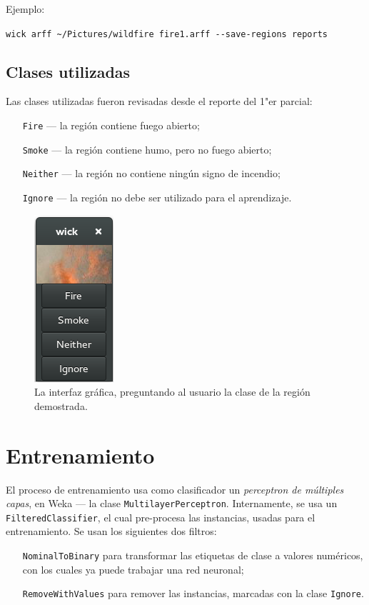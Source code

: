 \documentclass{article}
\begin{document}
\noindent
Ejemplo:

\verb|wick arff ~/Pictures/wildfire fire1.arff --save-regions reports|

\subsection{Clases utilizadas}

Las clases utilizadas fueron revisadas desde el reporte del 1"er parcial:
\begin{itemize}[leftmargin=6em]
\item[\texttt{Fire}]    --- la región contiene fuego abierto;
\item[\texttt{Smoke}]   --- la región contiene humo, pero no fuego abierto;
\item[\texttt{Neither}] --- la región no contiene ningún signo de incendio;
\item[\texttt{Ignore}]  --- la región no debe ser utilizado para el aprendizaje.
\end{itemize}

\begin{figure}[!h]
    \centering
    \includegraphics{wick-arff}
    \caption{La interfaz gráfica, preguntando al usuario la clase de la región demostrada.}
\end{figure}

\section{Entrenamiento}

El proceso de entrenamiento usa como clasificador un \emph{perceptron de múltiples capas},
en Weka --- la clase \verb|MultilayerPerceptron|.
Internamente, se usa un \verb|FilteredClassifier|, el cual pre-procesa las instancias,
usadas para el entrenamiento. Se usan los siguientes dos filtros:
\begin{itemize}[leftmargin=10em]
\item[\texttt{NominalToBinary}] para transformar las etiquetas de clase a valores numéricos,
                                con los cuales ya puede trabajar una red neuronal;
\item[\texttt{RemoveWithValues}] para remover las instancias, marcadas con la clase \verb|Ignore|.
\end{itemize}
\end{document}
